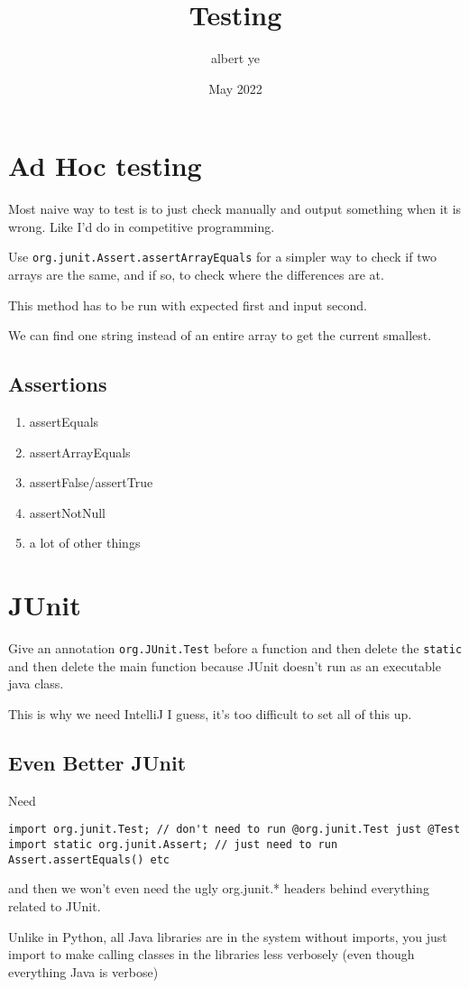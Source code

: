 \documentclass{scrartcl}
\title{Testing}
\author{albert ye}
\date{May 2022}
\begin{document}
\maketitle

\section{Ad Hoc testing}
Most naive way to test is to just check manually and output something when it is wrong. Like I'd
do in competitive programming.

Use \texttt{org.junit.Assert.assertArrayEquals} for a simpler way to check if two arrays are
the same, and if so, to check where the differences are at.

This method has to be run with expected first and input second. 

We can find one string instead of an entire array to get the current smallest.

\subsection{Assertions}
\begin{enumerate}
	\item assertEquals
	\item assertArrayEquals
	\item assertFalse/assertTrue
	\item assertNotNull
	\item a lot of other things
\end{enumerate}

\section{JUnit}

Give an annotation \texttt{org.JUnit.Test} before a function and then delete the \texttt{static}
and then delete the main function because JUnit doesn't run as an executable java class. 

This is why we need IntelliJ I guess, it's too difficult to set all of this up. 

\subsection{Even Better JUnit}
Need 
\begin{verbatim}
import org.junit.Test; // don't need to run @org.junit.Test just @Test
import static org.junit.Assert; // just need to run Assert.assertEquals() etc
\end{verbatim}
and then we won't even need the ugly org.junit.* headers behind everything related to JUnit.

Unlike in Python, all Java libraries are in the system without imports, you just import to
make calling classes in the libraries less verbosely (even though everything Java is verbose)
\end{document}
